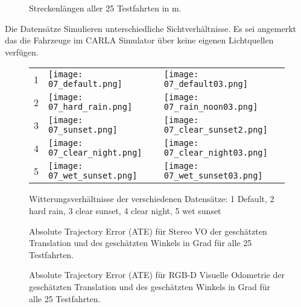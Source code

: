 	\begin{figure}[!ht]
	
	\caption[Testfahrten Streckenlängen]{Streckenlängen aller 25 Testfahrten in m.}
\end{figure}

Die Datensätze Simulieren unterschiedliche Sichtverhältnisse. Es sei angemerkt das die Fahrzeuge im CARLA Simulator über keine eigenen Lichtquellen verfügen.

\begin{figure}[!ht]
	\begin{tabular}{lll}
		1 & 	\texttt{[image: 07\_default.png]} &
		\texttt{[image: 07\_default03.png]}\\
		2 & 	\texttt{[image: 07\_hard\_rain.png]} &
		\texttt{[image: 07\_rain\_noon03.png]}\\
		3 & 	\texttt{[image: 07\_sunset.png]} &
		\texttt{[image: 07\_clear\_sunset2.png]}\\
		4 & \texttt{[image: 07\_clear\_night.png]} &
		\texttt{[image: 07\_clear\_night03.png]}\\
		5 & 	\texttt{[image: 07\_wet\_sunset.png]} &
		\texttt{[image: 07\_wet\_sunset03.png]}
		\end{tabular}
	\centering
	\caption[Witterungsverhältnisse der Simulation in verschiedenen Datensätzen]{Witterungsverhältnisse der verschiedenen Datensätze: 1 Default, 2 hard rain, 3 clear sunset, 4 clear night, 5 wet sunset}
	\label{fig:carlawetter}
\end{figure}


\newpage
\begin{figure}[!ht]
	
	
	\caption[Absolute Trajectory Error (ATE) für Stereokamera]{Absolute Trajectory Error (ATE) für Stereo VO der geschätzten Translation und des geschätzten Winkels in Grad für alle 25 Testfahrten.}
	
	
	\caption[Absolute Trajectory Error (ATE) für RGB-D]{Absolute Trajectory Error (ATE) für RGB-D Visuelle Odometrie der geschätzten Translation und des geschätzten Winkels in Grad für alle 25 Testfahrten.}
\end{figure}

